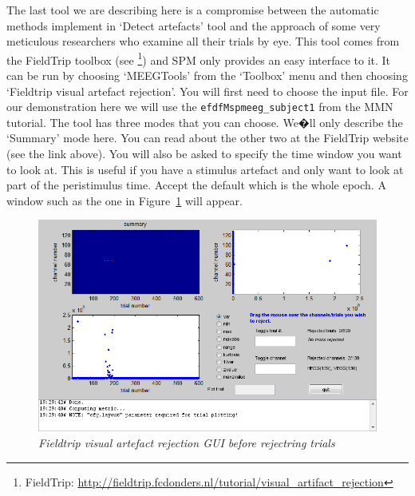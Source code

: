 The last tool we are describing here is a compromise between the automatic methods implement in `Detect artefacts' tool and the approach of some very meticulous researchers who examine all their trials by eye. This tool comes from the FieldTrip toolbox (see \footnote{FieldTrip: \url{http://fieldtrip.fcdonders.nl/tutorial/visual_artifact_rejection}}) and SPM only provides an easy interface to it. It can be run by choosing `MEEGTools' from the `Toolbox' menu and then choosing `Fieldtrip visual artefact rejection'. You will first need to choose the input file. For our demonstration here we will use the \texttt{efdfMspmeeg\_subject1} from the MMN tutorial. The tool has three modes that you can choose. We�ll only describe the `Summary' mode here. You can read about the other two at the FieldTrip website (see the link above). You will also be asked to specify the time window you want to look at. This is useful if you have a stimulus artefact and only want to look at part of the peristimulus time. Accept the default which is the whole epoch. A window such as the one in Figure~\ref{artefact_fig5} will appear.

 \begin{figure}
\begin{center}
\includegraphics[width=140mm]{meeg_artefact/figure5}
\caption{\em Fieldtrip visual artefact rejection GUI before rejectring trials\label{artefact_fig5}}
\end{center}
\end{figure}

